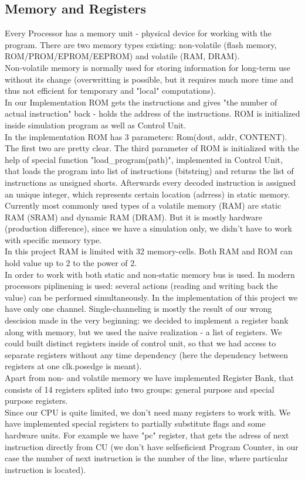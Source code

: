 \documentclass[11pt,a4paper]{article}
\begin{document}
\subsection{Memory and Registers}
Every Processor has a memory unit - physical device for working with the program. There are two memory types existing: non-volatile (flash memory,  ROM/PROM/EPROM/EEPROM) and volatile (RAM, DRAM).\\
Non-volatile memory is normally used for storing information for long-term use without its change (overwritting is possible, but it requires much more time and thus not efficient for temporary and "local" computations).\\
In our Implementation ROM gets the instructions and gives "the number of actual instruction" back - holds the address of the instructions. ROM is initialized inside simulation program as well as Control Unit.\\
In the implementation ROM has 3 parameters: Rom(dout, addr, CONTENT). The first two are pretty clear. The third parameter of ROM is initialized with the help of special function "load\_program(path)", implemented in Control Unit, that loads the program into list of instructions (bitstring) and returns the list of instructions as unsigned shorts. Afterwards every decoded instruction is assigned an  unique integer, which represents certain location (adrress) in static memory.\\
Currently most commonly used types of a volatile memory (RAM) are static RAM (SRAM) and dynamic RAM (DRAM). But it is mostly hardware (production difference), since we have a simulation only, we didn't have to work with specific memory type.\\
In this project RAM is limited with 32 memory-cells. Both RAM and ROM can hold value up to 2 to the power of 2. \\
In order to  work with both static and non-static memory bus is used. In modern processors piplinening is used: several actions (reading and writing back the value) can be performed simultaneously.
In the implementation of this project we have only one channel. Single-channeling is mostly the result of our wrong descision made in the very beginning: we decided to implement a register bank along with memory, but we used the naive realization - a list of registers. We could built distinct registers inside of control unit, so that we had access to separate registers without any time dependency (here the dependency between registers at one clk.posedge is meant).\\ 
Apart from non- and volatile memory we have implemented Register Bank, that consists of 14 registers splited into two groups: general purpose and special purpose registers.\\
Since our CPU is quite limited, we don't need many registers to work with. We have implemented special registers to partially substitute flags and some hardware units. For example we have "pc" register, that gets the adress of next instruction directly from CU (we don't have selfseficient Program Counter, in our case the number of next instruction is the number of the line, where particular instruction is located).\\
\end{document}
